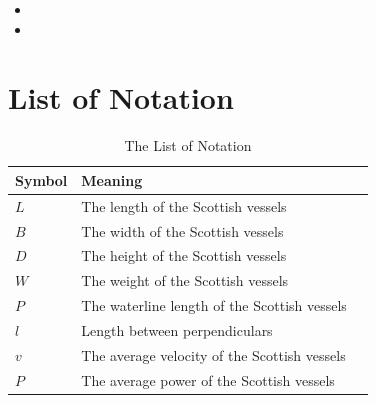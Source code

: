 \documentclass{mcmthesis}
\begin{document}
\begin{itemize}
\item 
\item 
\end{itemize}

\section{List of Notation}

\begin{center}
\begin{longtable}{p{}p{}m{}}
\caption{The List of Notation}\\
\hline
Symbol& Meaning \\
\hline

$L$      & The length of the Scottish vessels
                                                         \\
$B$      & The width of the Scottish vessels 
                                                          \\
$D$     & The height of the Scottish vessels 
                                                        \\
$W$     & The weight of the Scottish vessels 
                                                        \\
 $P$      & The   waterline length of the Scottish vessels
                                                        \\
$l$       & Length between perpendiculars                                                           \\
$v$      & The average velocity  of the Scottish vessels                                            \\
$P$      & The average power of the Scottish vessels
                                                        \\
                                                      

\end{longtable}
\end{center}
\end{document}
